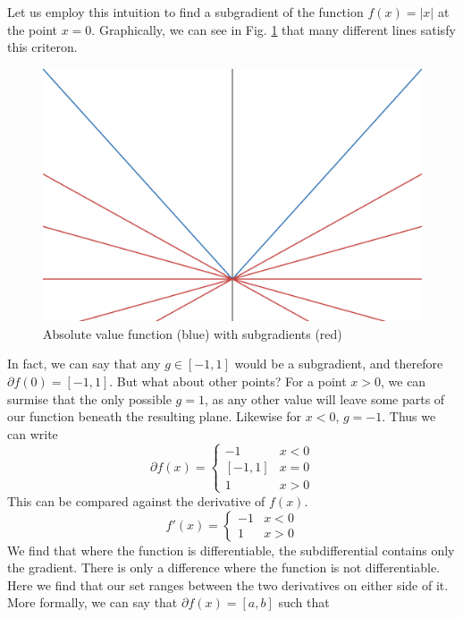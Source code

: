 \documentclass[conference]{IEEEtran}
\begin{document}
Let us employ this intuition to find a subgradient of the function \(f(x) = |x|\) at the point \(x=0\). Graphically, we can see in Fig. \ref{fig:abs subgradients} that many different lines satisfy this criteron.
\begin{figure}[tbp]
    \centering
    \includegraphics[width=\linewidth]{Figures/abs_subgradients.png}
    \caption{Absolute value function (blue) with subgradients (red)}
    \label{fig:abs subgradients}
\end{figure}
In fact, we can say that any \(g \in [-1,1]\) would be a subgradient, and therefore \(\partial f(0) = [-1,1]\). But what about other points? For a point \(x > 0\), we can surmise that the only possible \(g = 1\), as any other value will leave some parts of our function beneath the resulting plane. Likewise for \(x < 0\), \(g = -1\). Thus we can write
\begin{equation}\label{eq:abs subdifferential}
\partial f(x) = \begin{cases}
    -1 & x < 0 \\
    [-1, 1] & x = 0\\
    1 & x > 0
\end{cases}
\end{equation}
This can be compared against the derivative of \(f(x)\).
\begin{equation}\label{eq:abs derivative}
f'(x) = \begin{cases}
            -1 & x < 0\\
            1 & x > 0
\end{cases}
\end{equation}
We find that where the function is differentiable, the subdifferential contains only the gradient. There is only a difference where the function is not differentiable. Here we find that our set ranges between the two derivatives on either side of it. More formally, we can say that \(\partial f(x) = [a, b]\) such that
\end{document}
